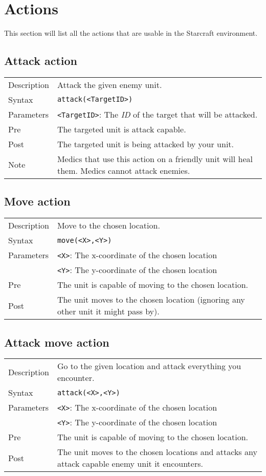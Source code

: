 \chapter{Actions}
This section will list all the actions that are usable in the Starcraft environment.

\section{Attack action}
\begin{tabularx}{\textwidth}{lX}
 Description & Attack the given enemy unit. \\
 Syntax & \verb|attack(<TargetID>)| \\
 Parameters & \verb|<TargetID>|: The \textit{ID} of the target that will be attacked.\\
 Pre & The targeted unit is attack capable. \\
 Post &  The targeted unit is being attacked by your unit.\\
 Note &  Medics that use this action on a friendly unit will heal them. Medics cannot attack enemies.
\end{tabularx}

\section{Move action}
\begin{tabularx}{\textwidth}{lX}
 Description & Move to the chosen location. \\
 Syntax & \verb|move(<X>,<Y>)| \\
 Parameters & \verb|<X>|: The x-coordinate of the chosen location \\
            &  \verb|<Y>|: The y-coordinate of the chosen location \\
 Pre & The unit is capable of moving to the chosen location. \\
 Post & The unit moves to the chosen location (ignoring any other unit it might pass by).
\end{tabularx}

\section{Attack move action}
\begin{tabularx}{\textwidth}{lX}
 Description & Go to the given location and attack everything you encounter. \\
 Syntax & \verb|attack(<X>,<Y>)| \\
 Parameters & \verb|<X>|: The x-coordinate of the chosen location \\
            & \verb|<Y>|: The y-coordinate of the chosen location \\
 Pre & The unit is capable of moving to the chosen location. \\
 Post & The unit moves to the chosen locations and attacks any attack capable enemy unit it encounters.
\end{tabularx}

